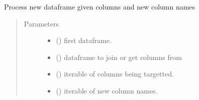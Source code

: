 \documentclass[letterpaper,10pt,english]{sphinxmanual}
\begin{document}
\begin{fulllineitems}
\label{\detokenize{dalio.util:dalio.util.process_new_df}}
Process new dataframe given columns and new column names
\begin{quote}\begin{description}
\item[{Parameters}] \leavevmode\begin{itemize}
\item {} 
 () \textendash{} first dataframe.

\item {} 
 () \textendash{} dataframe to join or get columns from

\item {} 
 () \textendash{} iterable of columns being targetted.

\item {} 
 () \textendash{} iterable of new column names.

\end{itemize}

\end{description}\end{quote}

\end{fulllineitems}

\end{document}
